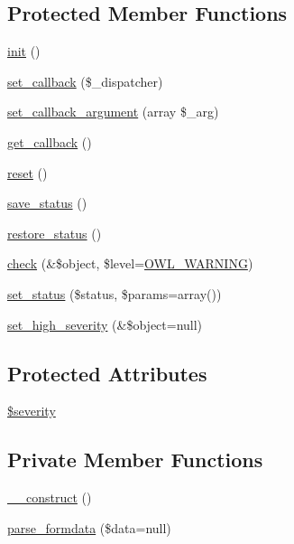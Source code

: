 \subsection*{Protected Member Functions}
\begin{DoxyCompactItemize}
\item 
\hyperlink{class__OWL_ae0ef3ded56e8a6b34b6461e5a721cd3e}{init} ()
\item 
\hyperlink{class__OWL_a28d9025eaf37b49d63cb334ed28c33f0}{set\_\-callback} (\$\_\-dispatcher)
\item 
\hyperlink{class__OWL_a1e26611ce858b237f5a98a91ea3c3a1b}{set\_\-callback\_\-argument} (array \$\_\-arg)
\item 
\hyperlink{class__OWL_abded13b1c97ea6e0cfe3c68cb6bcf7a5}{get\_\-callback} ()
\item 
\hyperlink{class__OWL_a2f2a042bcf31965194c03033df0edc9b}{reset} ()
\item 
\hyperlink{class__OWL_a9e49b9c76fbc021b244c6915ea536d71}{save\_\-status} ()
\item 
\hyperlink{class__OWL_a465eeaf40edd9f9c848841700c32ce55}{restore\_\-status} ()
\item 
\hyperlink{class__OWL_ae2e3c56e5f3c4ce4156c6b1bb1c50f63}{check} (\&\$object, \$level=\hyperlink{owl_8severitycodes_8php_ace886152e2e86cd2e91cb833fd495adb}{OWL\_\-WARNING})
\item 
\hyperlink{class__OWL_aea912d0ede9b3c2a69b79072d94d4787}{set\_\-status} (\$status, \$params=array())
\item 
\hyperlink{class__OWL_a576829692a3b66e3d518853bf43abae3}{set\_\-high\_\-severity} (\&\$object=null)
\end{DoxyCompactItemize}
\subsection*{Protected Attributes}
\begin{DoxyCompactItemize}
\item 
\hyperlink{class__OWL_ad26b40a9dbbacb33e299b17826f8327c}{\$severity}
\end{DoxyCompactItemize}
\subsection*{Private Member Functions}
\begin{DoxyCompactItemize}
\item 
\hyperlink{classFormHandler_a1ef7ad4fe143dd8339c8ab66423a1934}{\_\-\_\-construct} ()
\item 
\hyperlink{classFormHandler_aef73c198dbc5de4e84f6c2a23b8b294c}{parse\_\-formdata} (\$data=null)
\end{DoxyCompactItemize}

